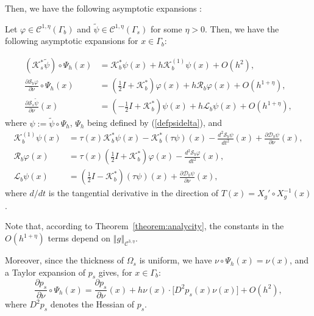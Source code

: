 Then, we have the following asymptotic expansions \cite{ammari2010conductivity,zribilayer}:
\begin{proposition} \label{pro:DL_operators}Let $\varphi\in\mathcal{C}^{1,\eta}(\Gamma_{b})$
and $\tilde{\psi}\in\mathcal{C}^{1,\eta}(\Gamma_{s})$ for some $\eta>0$.
Then, we have the following asymptotic expansions for $x\in\Gamma_{b}$:

\begin{equation}
\begin{aligned}\left(\mathcal{K}_{s}^{*}\tilde{\psi}\right)\circ\Psi_{h}(x) & =\mathcal{K}_{b}^{*}\psi(x)+h\mathcal{K}_{b}^{(1)}\psi(x)
+O(h^{2}),\\
\frac{\partial\mathcal{S}_{b}\varphi}{\partial\nu}\circ\Psi_{h}(x) & =\left(\frac{1}{2}I+\mathcal{K}_{b}^{*}\right)\varphi(x)+h\mathcal{R}_{b}\varphi(x)+O(h^{1+\eta}),\\
\frac{\partial\mathcal{S}_{s}\tilde{\psi}}{\partial\nu}(x) & =\left(-\frac{1}{2}I+\mathcal{K}_{b}^{*}\right)\psi(x)+h\mathcal{L}_{b}\psi(x)+O(h^{1+\eta}),
\end{aligned}
\label{eq:DL_operators}
\end{equation}
 where $\psi:=\tilde{\psi}\circ\Psi_{h}$, $\Psi_h$ being defined by (\ref{defpsidelta}), and
\begin{equation}
\begin{aligned}\mathcal{K}_{b}^{(1)}\psi(x) & =\tau(x)\mathcal{K}_{b}^{*}\psi(x)-\mathcal{K}_{b}^{*}(\tau\psi)(x)-\frac{d^{2}\mathcal{S}_{b}\psi}{dt^{2}}(x)+\frac{\partial\mathcal{D}_{b}\psi}{\partial\nu}(x),\\
\mathcal{R}_{b}\varphi(x) & =\tau(x)\left(\frac{1}{2}I+\mathcal{K}_{b}^{*}\right)\varphi(x)
-\frac{d^{2}\mathcal{S}_{b}\varphi}{dt^{2}}(x),\\
\mathcal{L}_{b}\psi(x) & =\left(\frac{1}{2}I-\mathcal{K}_{b}^{*}\right)(\tau\psi)(x)+\frac{\partial\mathcal{D}_{b}\psi}{\partial\nu}(x),
\end{aligned}
\label{eq:definition_K1_R_L}
\end{equation}
 where $d/dt$ is the tangential derivative in the direction of $T(x)=X_g' \circ X_g^{-1}(x)$.
\end{proposition} Note that, according to Theorem~\ref{theorem:analycity}, the constants in the $O(h^{1+\eta})$ terms depend on
$\left\Vert g\right\Vert _{\mathcal{C}^{3,\eta}}$.

Moreover, since the thickness of $\Omega_{s}$ is uniform, we have
$\nu\circ\Psi_{h}(x)=\nu(x)$, and a Taylor expansion of $p_s$
gives, for $x\in\Gamma_{b}$:
\begin{equation}
\frac{\partial p_s}{\partial\nu}\circ\Psi_{h}(x)=\frac{\partial
p_s}{\partial\nu}(x) +h \nu(x) \cdot \big[ D^{2}p_s(x)\nu(x)
\big] +O(h^{2}),\label{eq:DL_H}
\end{equation}
 where $D^{2}p_s$ denotes the Hessian of $p_s$.


